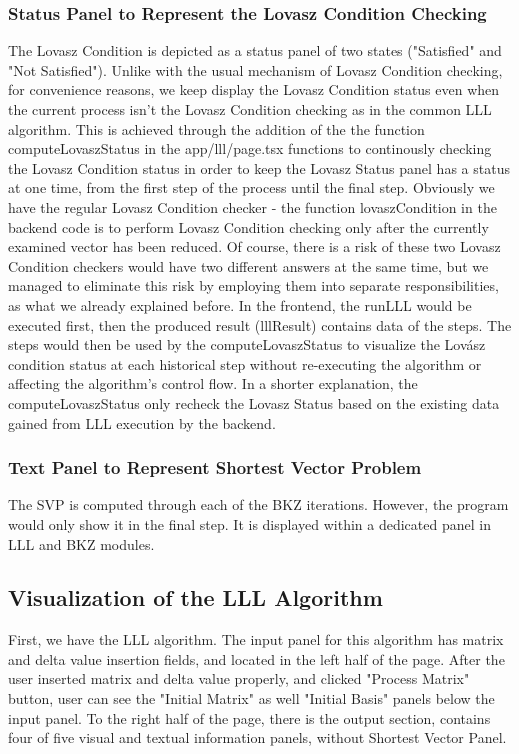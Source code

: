 \documentclass[runningheads]{llncs}
\begin{document}
\subsubsection{Status Panel to Represent the Lovasz Condition Checking}
\mbox{}
The Lovasz Condition is depicted as a status panel of two states ("Satisfied" and "Not Satisfied"). Unlike with the usual mechanism of Lovasz Condition checking, for convenience reasons, we keep display the Lovasz Condition status even when the current process isn't the Lovasz Condition checking as in the common LLL algorithm. This is achieved through the addition of the the function computeLovaszStatus in the app/lll/page.tsx functions to continously checking the Lovasz Condition status in order to keep the Lovasz Status panel has a status at one time, from the first step of the process until the final step. Obviously we have the regular Lovasz Condition checker - the function lovaszCondition in the backend code is to perform Lovasz Condition checking only after the currently examined vector has been reduced. Of course, there is a risk of these two Lovasz Condition checkers would have two different answers at the same time, but we managed to eliminate this risk by employing them into separate responsibilities, as what we already explained before. In the frontend, the runLLL would be executed first, then the produced result (lllResult) contains data of the steps. The steps would then be used by the computeLovaszStatus to visualize the Lovász condition status at each historical step without re-executing the algorithm or affecting the algorithm's control flow. In a shorter explanation, the computeLovaszStatus only recheck the Lovasz Status based on the existing data gained from LLL execution by the backend.

\subsubsection{Text Panel to Represent Shortest Vector Problem}
\mbox{}
The SVP is computed through each of the BKZ iterations. However, the program would only show it in the final step. It is displayed within a dedicated panel in LLL and BKZ modules.

\subsection{Visualization of the LLL Algorithm}
First, we have the LLL algorithm. The input panel for this algorithm has matrix and delta value insertion fields, and located in the left half of the page. After the user inserted matrix and delta value properly, and clicked "Process Matrix" button, user can see the "Initial Matrix" as well "Initial Basis" panels below the input panel. To the right half of the page, there is the output section, contains four of five visual and textual information panels, without Shortest Vector Panel. 
\end{document}

